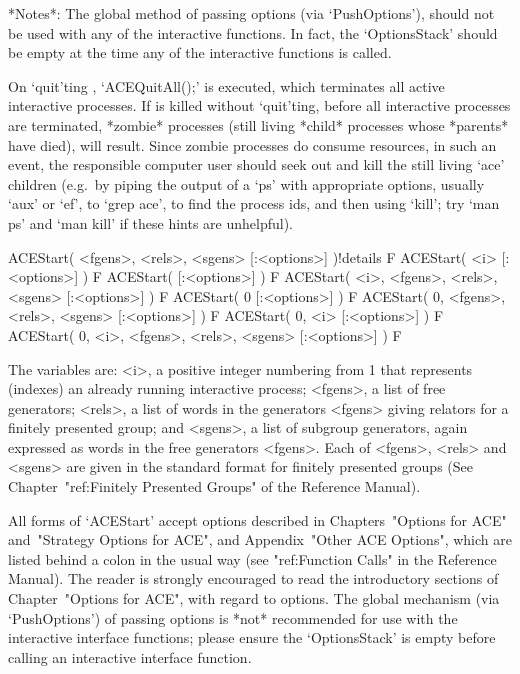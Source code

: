 *Notes*: 
The global method of passing options (via `PushOptions'),  should  not
be  used  with  any  of  the  interactive  functions.  In  fact,   the
`OptionsStack' should be empty at the  time  any  of  the  interactive
functions is called.

On `quit'ting {\GAP}, `ACEQuitAll();' is  executed,  which  terminates
all active interactive {\ACE} processes. If {\GAP} is  killed  without
`quit'ting, before all interactive {\ACE}  processes  are  terminated,
*zombie* processes (still living  *child*  processes  whose  *parents*
have died), will result. Since zombie processes do consume  resources,
in such an event, the responsible computer user should  seek  out  and
kill the still living `ace' children (e.g.~by piping the output  of  a
`ps' with appropriate options, usually `aux' or `ef', to  `grep  ace',
to find the process ids, and then using `kill'; try `man ps' and  `man
kill' if these hints are unhelpful).


\>ACEStart( <fgens>, <rels>, <sgens> [:<options>] )!{details} F
\>ACEStart( <i> [:<options>] ) F
\>ACEStart( [:<options>] ) F
\>ACEStart( <i>, <fgens>, <rels>, <sgens> [:<options>] ) F
\>ACEStart( 0 [:<options>] ) F
\>ACEStart( 0, <fgens>, <rels>, <sgens> [:<options>] ) F
\>ACEStart( 0, <i> [:<options>] ) F
\>ACEStart( 0, <i>, <fgens>, <rels>, <sgens> [:<options>] ) F

The variables are: <i>, a  positive  integer  numbering  from  1  that
represents (indexes) an already running  interactive  {\ACE}  process;
<fgens>, a list of free generators; <rels>, a list  of  words  in  the
generators <fgens> giving relators for a finitely presented group; and
<sgens>, a list of subgroup generators, again expressed  as  words  in
the free generators <fgens>. Each of <fgens>, <rels> and  <sgens>  are
given in the standard {\GAP} format for finitely presented groups (See
Chapter~"ref:Finitely  Presented  Groups"  of  the  {\GAP}   Reference
Manual).

All forms of `ACEStart' accept options described in  Chapters~"Options
for ACE" and~"Strategy  Options  for  ACE",  and  Appendix~"Other  ACE
Options", which are listed behind  a  colon  in  the  usual  way  (see
"ref:Function Calls" in the {\GAP} Reference Manual).  The  reader  is
strongly   encouraged   to   read   the   introductory   sections   of
Chapter~"Options  for  ACE",  with  regard  to  options.  The   global
mechanism (via `PushOptions') of passing options is *not*  recommended
for use with the interactive {\ACE} interface functions; please ensure
the `OptionsStack' is  empty  before  calling  an  interactive  {\ACE}
interface function. 

